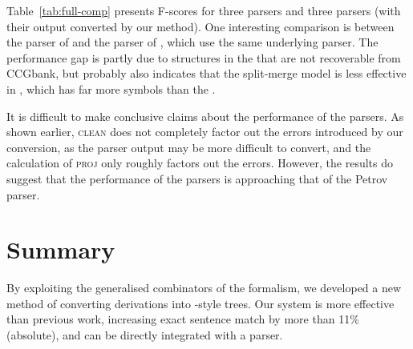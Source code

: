 Table~\ref{tab:full-comp} presents F-scores for three \ptb parsers and three
\ccg parsers (with their output converted by our method).  One interesting
comparison is between the \ptb parser of \textcite{Petrov-Klein:2007} and the
\ccg parser of \textcite{Fowler-Penn:2010}, which use the same underlying
parser.  The performance gap is partly due to structures in the \ptb that are
not recoverable from CCGbank, but probably also indicates that the split-merge
model is less effective in \ccg, which has far more symbols than the \ptb.

It is difficult to make conclusive claims about the performance of the parsers.
As shown earlier, \textsc{clean} does not completely factor out the errors
introduced by our conversion, as the parser output may be more difficult to
convert, and the calculation of \textsc{proj} only roughly factors out the
errors.  However, the results do suggest that the performance of the \ccg
parsers is approaching that of the Petrov parser.

\section{Summary}

By exploiting the generalised combinators of the \ccg formalism, we developed a new method of converting \ccg derivations into \ptb-style trees.
Our system is more effective than previous work, increasing exact sentence match by more than 11\% (absolute), and can be directly integrated with a \ccg parser.







